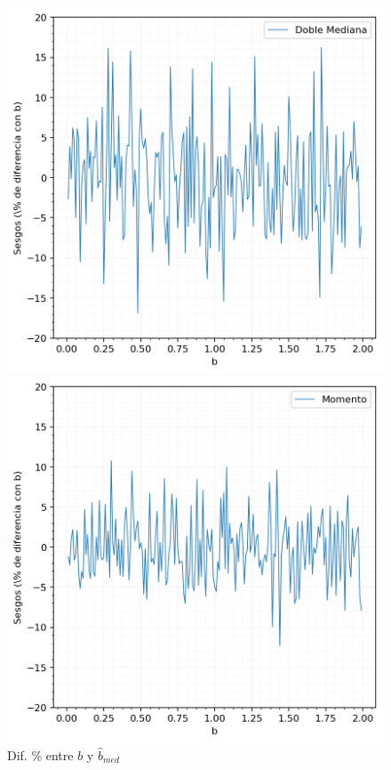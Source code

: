 \begin{figure}[H]
	\centering
	\begin{minipage}[t]{.325\textwidth}
		\centering
		\includegraphics[scale=0.37]{imagenes/sesgos-med-porcentaje-err.png}
		\caption{\footnotesize Dif. \% entre $b$ y $\hat{b}_{med}$}
		\label{fig:ej6-sesgos-err-med}
	\end{minipage}
	\begin{minipage}[t]{.325\textwidth}
		\centering
		\includegraphics[scale=0.37]{imagenes/sesgos-mom-porcentaje-err.png}

\end{minipage}
\end{figure}
